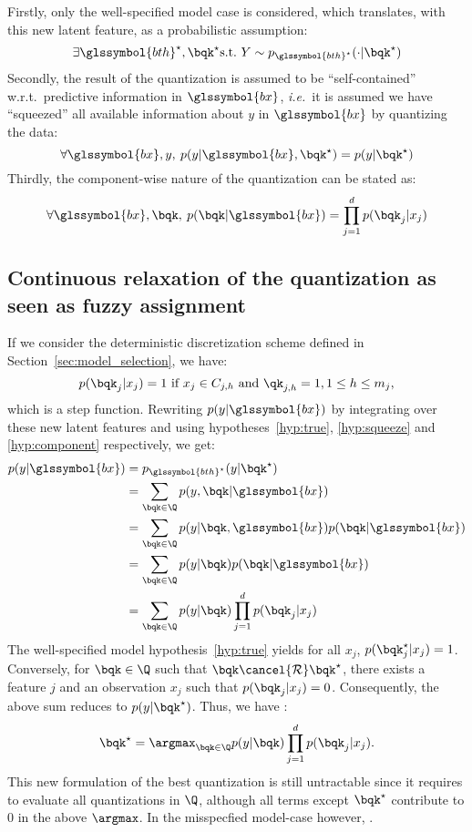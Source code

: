 Firstly, only the well-specified model case is considered, which translates, with this new latent feature, as a probabilistic assumption:
\begin{equation} \label{hyp:true}
\exists \glssymbol{bth}^\star, \bqk^\star \text{s.t.\ } Y \sim p_{\glssymbol{bth}^\star}(\cdot | \bqk^\star)
\end{equation}
Secondly, the result of the quantization is assumed to be ``self-contained'' w.r.t.\ predictive information in $\glssymbol{bx}$, \textit{i.e.}\ it is assumed we have ``squeezed'' all available information about $y$ in $\glssymbol{bx}$ by quantizing the data:
\begin{equation} \label{hyp:squeeze}
\forall \glssymbol{bx},y,\: p(y|\glssymbol{bx},\bqk^\star) = p(y|\bqk^\star)
\end{equation}
Thirdly, the component-wise nature of the quantization can be stated as:
\begin{equation} \label{hyp:component}
\forall \glssymbol{bx},\bqk,\: p(\bqk|\glssymbol{bx}) = \prod_{j=1}^d p(\bqk_j | x_j)
\end{equation}



\subsection{Continuous relaxation of the quantization as seen as fuzzy assignment}

If we consider the deterministic discretization scheme defined in Section~\ref{sec:model_selection}, we have:
$$
p(\bqk_j | x_j) = 1 \text{ if } x_j \in C_{j,h} \text{ and } \qk_{j,h} = 1, 1 \leq h \leq m_j,
$$
which is a step function. Rewriting $p(y| \glssymbol{bx})$ by integrating over these new latent features and using hypotheses~\ref{hyp:true}, \ref{hyp:squeeze} and \ref{hyp:component} respectively, we get:
\begin{align*}
p(y | \glssymbol{bx}) & = p_{\glssymbol{bth}^\star}(y | \bqk^\star) \\
& = \sum_{\bqk \in \Q} p(y, \bqk | \glssymbol{bx}) \\
& = \sum_{\bqk \in \Q} p(y | \bqk, \glssymbol{bx}) p(\bqk | \glssymbol{bx}) \\
& = \sum_{\bqk \in \Q} p(y | \bqk) p(\bqk | \glssymbol{bx}) \\
& = \sum_{\bqk \in \Q} p(y | \bqk) \prod_{j=1}^d p(\bqk_j | x_j)
\end{align*}
The well-specified model hypothesis~\ref{hyp:true} yields for all $x_j$, $p(\bqk_j^\star | x_j) = 1$. Conversely, for $\bqk \in \Q$ such that $\bqk \cancel{\mathcal{R}} \bqk^\star$, there exists a feature $j$ and an observation $x_j$ such that $p(\bqk_j | x_j) = 0$. Consequently, the above sum reduces to $p(y | \bqk^\star)$. Thus, we have :
\[ \bqk^\star = \argmax_{\bqk \in \Q} p(y|\bqk) \prod_{j=1}^d p(\bqk_j | x_j). \]
This new formulation of the best quantization is still untractable since it requires to evaluate all quantizations in $\Q$, although all terms except $\bqk^\star$ contribute to $0$ in the above $\argmax$. In the misspecfied model-case however, .

